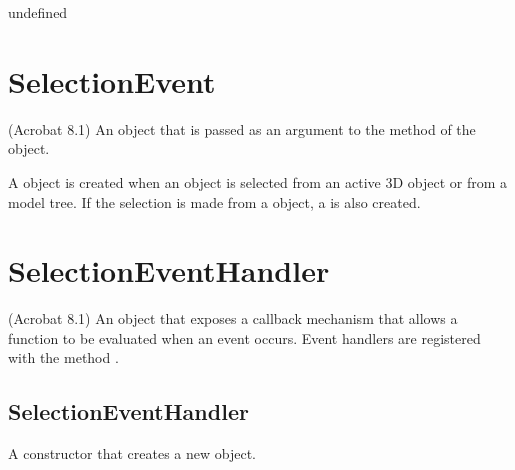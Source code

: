 \documentclass[letterpaper,12pt,english,openany,oneside]{sphinxmanual}
\begin{document}
\label{\detokenize{JS_3D_API:syntax-116}}

\begin{sphinxVerbatim}[commandchars=\\\{\}]
\end{sphinxVerbatim}
\label{\detokenize{JS_3D_API:parameters-84}}

\label{\detokenize{JS_3D_API:section-116}}\label{\detokenize{JS_3D_API:returns-117}}

undefined


\section{SelectionEvent}
\label{\detokenize{JS_3D_API:selectionevent}}
(Acrobat 8.1) An object that is passed as an argument to the  method of the  object.

A  object is created when an object is selected from an active 3D  object or from a model tree. If the selection is made from a  object, a  is also created.

\label{\detokenize{JS_3D_API:properties-29}}


\section{SelectionEventHandler}
\label{\detokenize{JS_3D_API:selectioneventhandler}}
(Acrobat 8.1) An object that exposes a callback mechanism that allows a function to be evaluated when an event occurs. Event handlers are registered with the  method .


\subsection{SelectionEventHandler}
\label{\detokenize{JS_3D_API:selectioneventhandler-1}}\label{\detokenize{JS_3D_API:id34}}
A constructor that creates a new  object.
\end{document}
